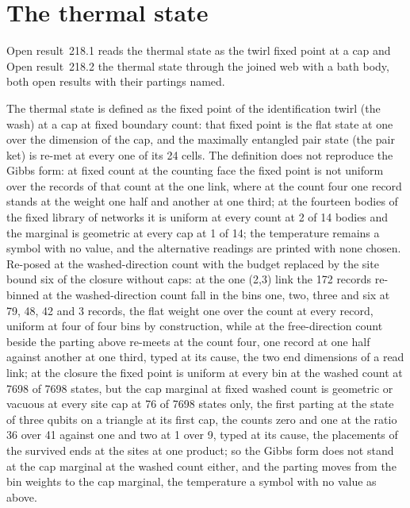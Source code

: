 \section{The thermal state}\label{mod:XI-2-thermal-state}
\label{narr:open:11-2}Open result~218.1 reads the thermal state as the twirl fixed point at a cap and Open result~218.2 the thermal state through the joined web with a bath body, both open results with their partings named.
\begin{chwall}\label{box:XI-2-thermal-state:1}
The thermal state is defined as the fixed point of the identification twirl (the wash) at a cap at fixed boundary count: that fixed point is the flat state at one over the dimension of the cap, and the maximally entangled pair state (the pair ket) is re-met at every one of its 24 cells. The definition does not reproduce the Gibbs form: at fixed count at the counting face the fixed point is not uniform over the records of that count at the one link, where at the count four one record stands at the weight one half and another at one third; at the fourteen bodies of the fixed library of networks it is uniform at every count at 2 of 14 bodies and the marginal is geometric at every cap at 1 of 14; the temperature remains a symbol with no value, and the alternative readings are printed with none chosen.
Re-posed at the washed-direction count with the budget replaced by the site bound six of the closure without caps: at the one (2,3) link the 172 records re-binned at the washed-direction count fall in the bins one, two, three and six at 79, 48, 42 and 3 records, the flat weight one over the count at every record, uniform at four of four bins by construction, while at the free-direction count beside the parting above re-meets at the count four, one record at one half against another at one third, typed at its cause, the two end dimensions of a read link; at the closure the fixed point is uniform at every bin at the washed count at 7698 of 7698 states, but the cap marginal at fixed washed count is geometric or vacuous at every site cap at 76 of 7698 states only, the first parting at the state of three qubits on a triangle at its first cap, the counts zero and one at the ratio 36 over 41 against one and two at 1 over 9, typed at its cause, the placements of the survived ends at the sites at one product; so the Gibbs form does not stand at the cap marginal at the washed count either, and the parting moves from the bin weights to the cap marginal, the temperature a symbol with no value as above.
\end{chwall}
